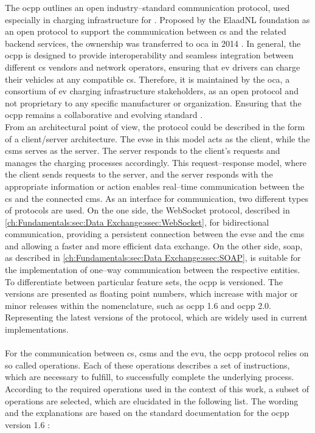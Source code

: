 The \acrfull{ocpp} outlines an open industry--standard communication protocol, used especially in charging infrastructure for . Proposed by the ElaadNL foundation as an open protocol to support the communication between \acrshort{cs} and the related backend services, the ownership was transferred to \acrshort{oca} in 2014 \cite{garofalaki_electric_2022}.
In general, the \acrshort{ocpp} is designed to provide interoperability and seamless integration between different \acrshort{cs} vendors and network operators, ensuring that \acrshort{ev} drivers can charge their vehicles at any compatible \acrshort{cs}.
Therefore, it is maintained by the \acrfull{oca}, a consortium of \acrshort{ev} charging infrastructure stakeholders, as an open protocol and not proprietary to any specific manufacturer or organization. 
Ensuring that the \acrshort{ocpp} remains a collaborative and evolving standard \cite{noauthor_ocpp_nodate}. \\
From an architectural point of view, the protocol could be described in the form of a client/server architecture. The \acrshort{evse} in this model acts as the client, while the \acrshort{csms} serves as the server. 
The server responds to the client's requests and manages the charging processes accordingly. This request--response model, where the client sends requests to the server, and the server responds with the appropriate information or action enables real--time communication between the \acrfull{cs} and the connected \acrfull{cms}.
As an interface for communication, two different types of protocols are used. On the one side, the WebSocket protocol, described in \ref{ch:Fundamentals:sec:Data Exchange:ssec:WebSocket}, for bidirectional communication, providing a persistent connection between the \acrshort{evse} and the \acrshort{cms} and allowing a faster and more efficient data exchange. On the other side, \acrfull{soap}, as described in \ref{ch:Fundamentals:sec:Data Exchange:ssec:SOAP}, is suitable for the implementation of one--way communication between the respective entities.
To differentiate between particular feature sets, the \acrshort{ocpp} is versioned. 
The versions are presented as floating point numbers, which increase with major or minor releases within the nomenclature, such as \acrshort{ocpp} 1.6 and \acrshort{ocpp} 2.0. Representing the latest versions of the protocol, which are widely used in current implementations. \\ \\
\noindent For the communication between \acrshort{cs}, \acrshort{csms} and the \acrshort{evu}, the \acrshort{ocpp} protocol relies on so called operations. Each of these operations describes a set of instructions, which are necessary to fulfill, to successfully complete the underlying process.
According to the required operations used in the context of this work, a subset of operations are selected, which are elucidated in the following list. 
The wording and the explanations are based on the standard documentation for the \acrshort{ocpp} version 1.6 \cite{noauthor_ocpp_nodate}:

